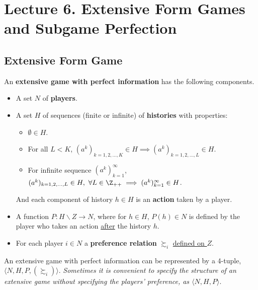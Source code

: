 \documentclass[11pt]{article}
\begin{document}
	\section{Lecture 6. Extensive Form Games and Subgame Perfection}
		\subsection{Extensive Form Game}
			\begin{definition}[89.1]
				An \textbf{extensive game with perfect information} has the following components.
				\begin{itemize}
					\item A set $N$ of \textbf{players}.
					\item A set $H$ of sequences (finite or infinite) of \textbf{histories} with properties:
						\begin{itemize}
							\item $\emptyset \in H$.
							\item For all $L < K$, $(a^k)_{k=1,2,\dots,K} \in H \implies (a^k)_{k=1,2,\dots,L} \in H$.
							\item For infinite sequence $(a^k)_{k=1}^\infty$,\\ $(a^k)_{k=1,2,\dots,L} \in H,\ \forall L \in \Z_{++} \implies (a^k)_{k=1}^\infty \in H$.
						\end{itemize} And each component of history $h \in H$ is an \textbf{action} taken by a player.
					\item A function $P: H \backslash Z \to N$, where for $h \in H$, $P(h) \in N$ is defined by the player who takes an action \ul{after} the history $h$.
					\item For each player $i \in N$ a \textbf{preference relation} $\succsim_i$ \ul{defined on $Z$}.
				\end{itemize}
			\end{definition}
			
			\begin{notation}[pg.90]
				An extensive game with perfect information can be represented by a 4-tuple, $\langle N, H, P, (\succsim_i) \rangle$. \emph{Sometimes it is convenient to specify the structure of an extensive game without specifying the players' preference, as $\langle N, H, P \rangle$}.
			\end{notation}
			
\end{document}
